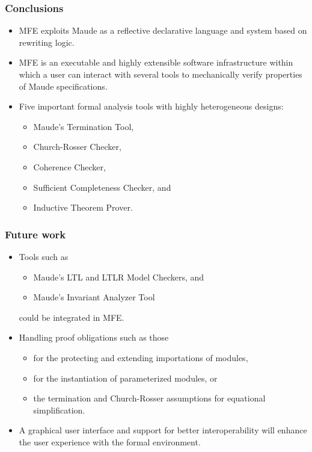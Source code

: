 \documentclass[xcolor=dvipsnames,10pt]{beamer}
\begin{document}
\begin{frame}
  \frametitle{Conclusions}

\begin{itemize}
\item MFE exploits Maude as a reflective declarative language and system based on 
rewriting logic.

\item MFE is
an executable and highly extensible software infrastructure 
within which a user can interact with several 
tools to mechanically verify properties of Maude specifications.

\item Five important formal analysis tools with highly heterogeneous designs: 

\begin{itemize}
\item Maude's Termination Tool, 
\item Church-Rosser Checker, 
\item Coherence Checker, 
\item Sufficient Completeness Checker, and 
\item Inductive Theorem Prover.
\end{itemize}
\end{itemize}

\end{frame}
\begin{frame}
  \frametitle{Future work}

\begin{itemize}
\item Tools such as 
\begin{itemize}
\item Maude's LTL and LTLR Model Checkers, and 
\item Maude's Invariant Analyzer Tool
\end{itemize}
could be integrated in MFE.
\item
Handling proof obligations such as those 
\begin{itemize}
\item for the protecting and extending importations of modules, 
\item for the instantiation of parameterized modules, or 
\item the termination and Church-Rosser assumptions for equational simplification. 
\end{itemize}
\item A graphical
user interface and support for better interoperability will enhance the
user experience with the formal environment. 
\end{itemize}

\end{frame}
\end{document}
